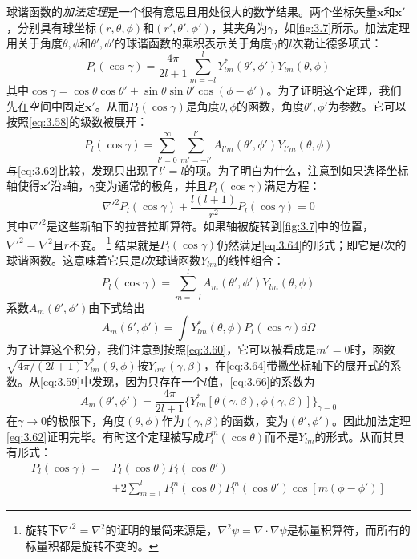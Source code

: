 \documentclass[12pt]{book}
\numberwithin{equation}{chapter}
\numberwithin{figure}{chapter}
\numberwithin{footnote}{page}
\begin{document}
球谐函数的\textit{加法定理}是一个很有意思且用处很大的数学结果。两个坐标矢量$\mathbf{x}$和$\mathbf{x'}$，分别具有球坐标$(r,\theta,\phi)$和$(r',\theta',\phi')$，其夹角为$\gamma$，如\autoref{fig:3.7}所示。加法定理用关于角度$\theta,\phi$和$\theta',\phi'$的球谐函数的乘积表示关于角度$\gamma$的$l$次勒让德多项式：
\begin{equation}\label{eq:3.62}
    P_l(\cos\gamma)=\frac{4\pi}{2l+1}\sum_{m=-l}^l Y_{lm}^*(\theta',\phi')Y_{lm}(\theta,\phi)
\end{equation}
其中$\cos\gamma=\cos\theta\cos\theta'+\sin\theta\sin\theta'\cos(\phi-\phi')$。为了证明这个定理，我们先在空间中固定$\mathbf{x'}$。从而$P_l(\cos\gamma)$是角度$\theta,\phi$的函数，角度$\theta',\phi'$为参数。它可以按照\autoref{eq:3.58}的级数被展开：
\begin{equation}\label{eq:3.63}
    P_l(\cos\gamma)=\sum_{l'=0}^\infty\sum_{m'=-l'}^{l'} A_{l'm}(\theta',\phi')Y_{l'm}(\theta,\phi)
\end{equation}
与\autoref{eq:3.62}比较，发现只出现了$l'=l$的项。为了明白为什么，注意到如果选择坐标轴使得$\mathbf{x'}$沿$z$轴，$\gamma$变为通常的极角，并且$P_l(\cos\gamma)$满足方程：
\begin{equation}\label{eq:3.64}
    \nabla'^2P_l(\cos\gamma)+\frac{l(l+1)}{r^2}P_l(\cos\gamma)=0
\end{equation}
其中$\nabla'^2$是这些新轴下的拉普拉斯算符。如果轴被旋转到\autoref{fig:3.7}中的位置，$\nabla'^2=\nabla^2$且$r$不变。
\footnote{旋转下$\nabla'^2=\nabla^2$的证明的最简来源是，$\nabla^2\psi=\nabla\cdot\nabla\psi$是标量积算符，而所有的标量积都是旋转不变的。}
结果就是$P_l(\cos\gamma)$仍然满足\autoref{eq:3.64}的形式；即它是$l$次的球谐函数。这意味着它只是$l$次球谐函数$Y_{lm}$的线性组合：
\begin{equation}\label{eq:3.65}
    P_l(\cos\gamma)=\sum_{m=-l}^l A_m(\theta',\phi')Y_{lm}(\theta,\phi)
\end{equation}
系数$A_m(\theta',\phi')$由下式给出
\begin{equation}\label{eq:3.66}
    A_m(\theta',\phi')=\int Y_{lm}^*(\theta,\phi)P_l(\cos\gamma)d\Omega
\end{equation}
为了计算这个积分，我们注意到按照\autoref{eq:3.60}，它可以被看成是$m'=0$时，函数$\sqrt{4\pi/(2l+1)}Y_{lm}^*(\theta,\phi)$按$Y_{lm'}(\gamma,\beta)$，在\autoref{eq:3.64}带撇坐标轴下的展开式的系数。从\autoref{eq:3.59}中发现，因为只存在一个$l$值，\autoref{eq:3.66}的系数为
\begin{equation}\label{eq:3.67}
    A_m(\theta',\phi')=\frac{4\pi}{2l+1}\{Y_{lm}^*[\theta(\gamma,\beta),\phi(\gamma,\beta)]\}_{\gamma=0}
\end{equation}
在$\gamma\to0$的极限下，角度$(\theta,\phi)$作为$(\gamma,\beta)$的函数，变为$(\theta',\phi')$。因此加法定理\autoref{eq:3.62}证明完毕。有时这个定理被写成$P_l^m(\cos\theta)$而不是$Y_{lm}$的形式。从而其具有形式：
\begin{equation}\label{eq:3.68}
    \begin{aligned}
        P_l(\cos\gamma)=&P_l(\cos\theta)P_l(\cos\theta')\\
        &+2\sum_{m=1}^l P_l^m(\cos\theta)P_l^m(\cos\theta')\cos[m(\phi-\phi')]
    \end{aligned}
\end{equation}
\end{document}

